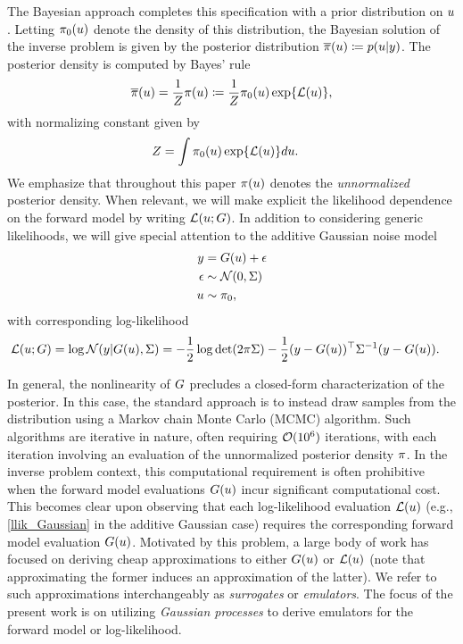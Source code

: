 \documentclass[12pt]{article}
\begin{document}
The Bayesian approach completes this specification with a prior distribution 
on $u$. Letting $\pi_0(u)$ denote the density of this distribution, the Bayesian solution of the inverse problem is given 
by the posterior distribution $\overline{\pi}(u) \coloneqq p(u | y)$. The posterior density is computed by Bayes' rule 
\begin{align}
\overline{\pi}(u) = \frac{1}{Z}\pi(u) \coloneqq \frac{1}{Z} \pi_0(u) \exp\mathopen{}\left\{\mathcal{L}(u)\right\}\mathclose{}, \label{post_dens}
\end{align}
with normalizing constant given by 
\begin{align}
Z &= \int \pi_0(u) \exp\mathopen{}\left\{\mathcal{L}(u)\right\}\mathclose{} du. \label{norm_cst}
\end{align}
We emphasize that throughout this paper $\pi(u)$ denotes the \textit{unnormalized} 
posterior density. When relevant, we will make explicit the likelihood dependence on the forward 
model by writing $\mathcal{L}(u; G)$. In addition to considering 
generic likelihoods, we will give special attention to the additive Gaussian noise model
\begin{align}
y &= G(u) + \epsilon \label{inv_prob_Gaussian} \\
\epsilon &\sim \mathcal{N}(0, \Sigma) \nonumber \\
u &\sim \pi_0 \nonumber, 
\end{align}
with corresponding log-likelihood 
\begin{align}
\mathcal{L}(u; G) &= \log\mathcal{N}(y| G(u), \Sigma) 
= -\frac{1}{2} \log\det (2\pi \Sigma) - \frac{1}{2} (y - G(u))^\top \Sigma^{-1} (y - G(u)). \label{llik_Gaussian}
\end{align}

In general, the nonlinearity of $G$ precludes a closed-form characterization of the posterior. In this case, the 
standard approach is to instead draw samples from the distribution using a Markov chain Monte Carlo (MCMC) 
algorithm. Such algorithms are iterative in nature, often requiring $\mathcal{O}(10^6)$ iterations, with each 
iteration involving an evaluation of the unnormalized posterior density $\pi$. In the inverse problem 
context, this computational requirement is often prohibitive when the forward model evaluations $G(u)$
incur significant computational cost. This becomes clear upon observing that each log-likelihood evaluation 
$\mathcal{L}(u)$ (e.g., \ref{llik_Gaussian} in the additive Gaussian case) requires the corresponding forward 
model evaluation $G(u)$. Motivated by this problem, a large body of work has focused on deriving 
cheap approximations to either $G(u)$ or $\mathcal{L}(u)$ (note that approximating the former induces 
an approximation of the latter). We refer to such approximations interchangeably 
as \textit{surrogates} or \textit{emulators}. The focus of the present work is on utilizing \textit{Gaussian processes} 
to derive emulators for the forward model or log-likelihood. 
\end{document}
